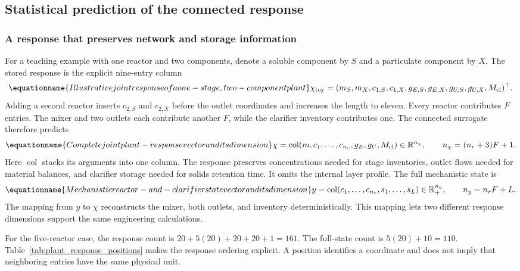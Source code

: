 \subsection{Statistical prediction of the connected response}

\subsubsection{A response that preserves network and storage information}

For a teaching example with one reactor and two components, denote a soluble component by $S$ and a particulate component by $X$. The stored response is the explicit nine-entry column
\begin{equation}
\equationname{Illustrative joint response of a one-stage, two-component plant}
\chi_{\rm toy}=
(m_S,m_X,c_{1,S},c_{1,X},g_{E,S},g_{E,X},g_{U,S},g_{U,X},M_{\rm cl})^\top.
\end{equation}
Adding a second reactor inserts $c_{2,S}$ and $c_{2,X}$ before the outlet coordinates and increases the length to eleven. Every reactor contributes $F$ entries. The mixer and two outlets each contribute another $F$, while the clarifier inventory contributes one. The connected surrogate therefore predicts
\begin{equation}
\equationname{Complete joint plant-response vector and its dimension}
\chi=\operatorname{col}(m,c_1,\ldots,c_{n_r},g_E,g_U,M_{\rm cl})
\in\mathbb R^{n_\chi},\qquad n_\chi=(n_r+3)F+1.
\label{eq:plant_joint_response}
\end{equation}
Here $\operatorname{col}$ stacks its arguments into one column. The response preserves concentrations needed for stage inventories, outlet flows needed for material balances, and clarifier storage needed for solids retention time. It omits the internal layer profile. The full mechanistic state is
\begin{equation}
\equationname{Mechanistic reactor-and-clarifier state vector and its dimension}
y=\operatorname{col}(c_1,\ldots,c_{n_r},s_1,\ldots,s_L)
\in\mathbb R_+^{n_y},\qquad n_y=n_rF+L.
\label{eq:plant_mechanistic_state}
\end{equation}
The mapping from $y$ to $\chi$ reconstructs the mixer, both outlets, and inventory deterministically. This mapping lets two different response dimensions support the same engineering calculations.

For the five-reactor case, the response count is $20+5(20)+20+20+1=161$. The full-state count is $5(20)+10=110$. Table~\ref{tab:plant_response_positions} makes the response ordering explicit. A position identifies a coordinate and does not imply that neighboring entries have the same physical unit.

